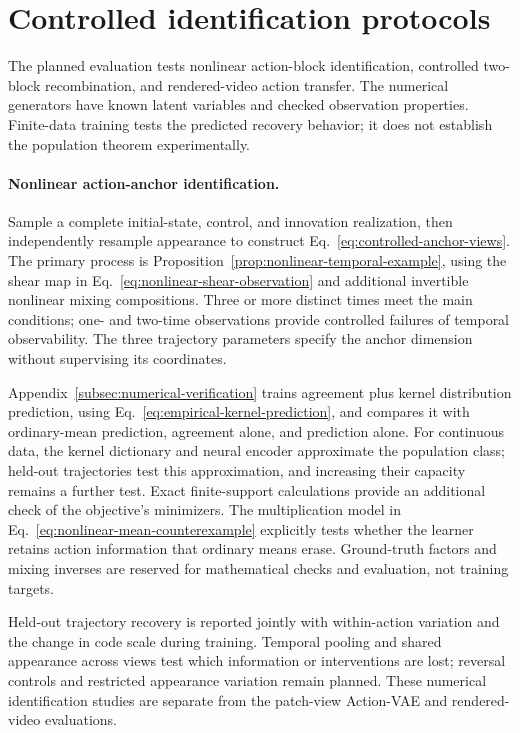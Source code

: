 \section{Controlled identification protocols}
\label{subsec:synthetic-protocol-details}

The planned evaluation tests nonlinear action-block identification,
controlled two-block recombination, and rendered-video action transfer.
The numerical generators have known latent variables and checked
observation properties. Finite-data training tests the predicted recovery
behavior; it does not establish the population theorem experimentally.

\paragraph{Nonlinear action-anchor identification.}
Sample a complete initial-state, control, and innovation realization,
then independently resample appearance to construct
Eq.~\ref{eq:controlled-anchor-views}. The primary process is
Proposition~\ref{prop:nonlinear-temporal-example}, using the shear map
in Eq.~\ref{eq:nonlinear-shear-observation} and additional invertible
nonlinear mixing compositions. Three or more distinct times meet the
main conditions; one- and two-time observations provide controlled
failures of temporal observability. The three trajectory parameters
specify the anchor dimension without supervising its coordinates.

Appendix~\ref{subsec:numerical-verification} trains agreement plus kernel
distribution prediction, using Eq.~\ref{eq:empirical-kernel-prediction},
and compares it with ordinary-mean prediction, agreement alone, and
prediction alone. For continuous data, the kernel dictionary and neural
encoder approximate the population class; held-out trajectories test this
approximation, and increasing their capacity remains a further test. Exact finite-support
calculations provide an additional check of the objective's minimizers.
The multiplication model in Eq.~\ref{eq:nonlinear-mean-counterexample}
explicitly tests whether the learner retains action information that
ordinary means erase. Ground-truth factors and mixing inverses are
reserved for mathematical checks and evaluation, not training targets.

Held-out trajectory recovery is reported jointly with within-action
variation and the change in code scale during training.
Temporal pooling and shared appearance across views test which information
or interventions are lost; reversal controls and restricted appearance
variation remain planned.
These numerical identification studies are separate from the patch-view
Action-VAE and rendered-video evaluations.

